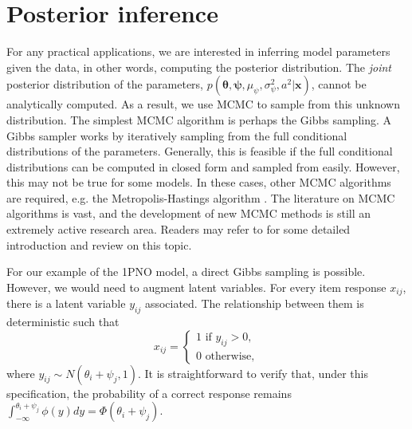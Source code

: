 \documentclass[floatsintext, man]{apa7}
\begin{document}
\section{Posterior inference}
For any practical applications, we are interested in inferring model parameters
given the data, in other words, computing the posterior distribution. The
\textit{joint} posterior distribution of the parameters, $p(\bm{\theta}, 
\bm{\psi}, \mu_\psi, \sigma_\psi^2, a^2 | \bm{x})$, cannot be analytically
computed. As a result, we use MCMC to sample from this unknown distribution. The
simplest MCMC algorithm is perhaps the Gibbs sampling. A Gibbs sampler
\parencite{geman_stochastic_1984} works by iteratively sampling from the full
conditional distributions of the parameters. Generally, this is feasible if the
full conditional distributions can be computed in closed form and sampled from
easily. However, this may not be true for some models. In these cases, other
MCMC algorithms are required, e.g. the Metropolis-Hastings algorithm 
\parencite{hastings_monte_1970}. The literature on MCMC algorithms is vast, and
the development of new MCMC methods is still an extremely active research area.
Readers may refer to \textcite{gelman_bayesian_2013,neal_probabilistic_1998} for
some detailed introduction and review on this topic.

For our example of the 1PNO model, a direct Gibbs sampling is possible. However,
we would need to augment latent variables. For every item response $x_{ij}$,
there is a latent variable $y_{ij}$ associated. The relationship between them is
deterministic such that
\[ x_{ij} = \begin{cases} 
            1 \text{ if } y_{ij} > 0,\\
            0 \text{ otherwise},
            \end{cases}
\]
where $y_{ij} \sim N(\theta_i + \psi_j, 1)$. It is straightforward to verify
that, under this specification, the probability of a correct response remains
$\int_{-\infty}^{\theta_i + \psi_j} \phi(y) dy = \Phi(\theta_i + \psi_j)$.
\end{document}

